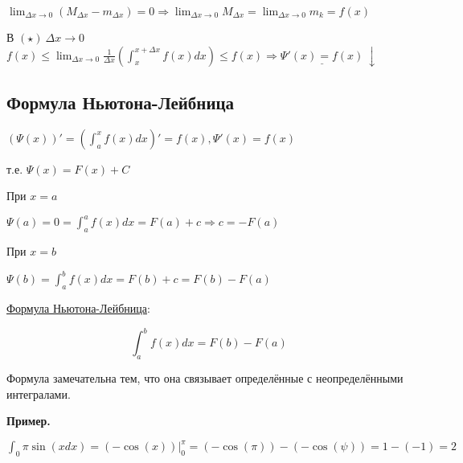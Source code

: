 \documentclass{article}
\begin{document}
\( \lim_{\Delta x \to 0}(M_{\Delta x} - m_{\Delta x}) = 0 \Rightarrow \lim_{\Delta x \to 0} M_{\Delta x} = \lim_{\Delta x \to 0} m_k = f(x)\)

В \((\star)\ \Delta x \to 0\)
\( f(x) \leq \lim_{\Delta x \to 0} \frac{1}{\Delta x} (\int_{x}^{x + \Delta x} f(x)dx) \leq f(x) \Rightarrow \underline{\Psi'(x) = f(x)}\ \downarrow\)

\subsection{Формула Ньютона-Лейбница}
\( (\Psi(x))' = (\int_{a}^{x}f(x)dx)' = f(x), \Psi'(x) = f(x) \)

т.е. \( \Psi(x) = F(x) + C\)

При \(x = a\)

\(\Psi(a) = 0 = \int_a^a f(x)dx = F(a)+c \Rightarrow c = -F(a)\)

При \(x = b\)

\(\Psi(b) = \int_a^b f(x)dx = F(b)+c = F(b) - F(a)\)

\underline{Формула Ньютона-Лейбница}:

\[\int_{a}^{b}f(x)dx = F(b) - F(a)\]

Формула замечательна тем, что она связывает определённые с неопределёнными интегралами.

\textbf{Пример.}

\( \int_{0}{\pi} \sin(xdx) = (-\cos(x))\bigg\rvert_0^{\pi} = (-\cos(\pi)) - (-\cos(\psi)) = 1 - (-1) = 2\)
\end{document}
